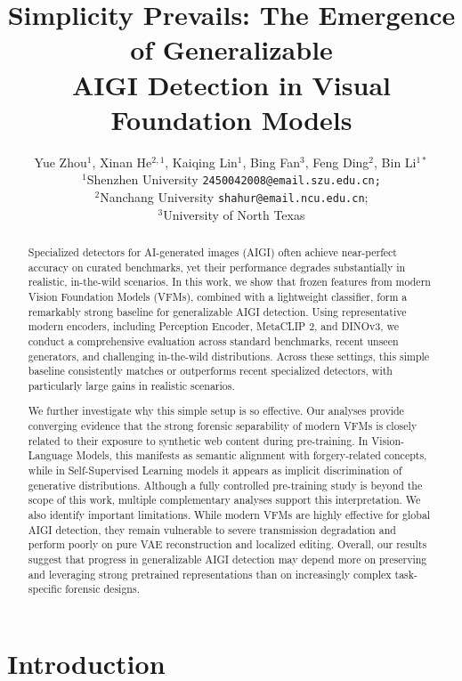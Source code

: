 \documentclass[sigconf,screen]{acmart}
\title[Simplicity Prevails for Generalizable AIGI Detection]{Simplicity Prevails: The Emergence of Generalizable\\AIGI Detection in Visual Foundation Models}
\author{Yue Zhou$^{1}$, Xinan He$^{2,1}$, Kaiqing Lin$^{1}$, Bing Fan$^{3}$, Feng Ding$^{2}$, Bin Li$^{1 \ast}$\\
$^{1}$Shenzhen University {\tt \small 2450042008@email.szu.edu.cn;} \\
$^{2}$Nanchang University {\tt \small shahur@email.ncu.edu.cn};\\
$^{3}$University of North Texas}
\theoremstyle{plain}
\theoremstyle{definition}
\theoremstyle{remark}
\begin{document}
\begin{abstract}
Specialized detectors for AI-generated images (AIGI) often achieve near-perfect accuracy on curated benchmarks, yet their performance degrades substantially in realistic, in-the-wild scenarios. In this work, we show that frozen features from modern Vision Foundation Models (VFMs), combined with a lightweight classifier, form a remarkably strong baseline for generalizable AIGI detection. Using representative modern encoders, including Perception Encoder, MetaCLIP 2, and DINOv3, we conduct a comprehensive evaluation across standard benchmarks, recent unseen generators, and challenging in-the-wild distributions. Across these settings, this simple baseline consistently matches or outperforms recent specialized detectors, with particularly large gains in realistic scenarios.

We further investigate why this simple setup is so effective. Our analyses provide converging evidence that the strong forensic separability of modern VFMs is closely related to their exposure to synthetic web content during pre-training. In Vision-Language Models, this manifests as semantic alignment with forgery-related concepts, while in Self-Supervised Learning models it appears as implicit discrimination of generative distributions. Although a fully controlled pre-training study is beyond the scope of this work, multiple complementary analyses support this interpretation.
We also identify important limitations. While modern VFMs are highly effective for global AIGI detection, they remain vulnerable to severe transmission degradation and perform poorly on pure VAE reconstruction and localized editing. Overall, our results suggest that progress in generalizable AIGI detection may depend more on preserving and leveraging strong pretrained representations than on increasingly complex task-specific forensic designs.
\end{abstract}



\maketitle


\section{Introduction}
\label{sec:intro}
\end{document}
